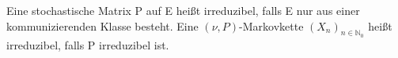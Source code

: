 Eine stochastische Matrix P auf E heißt irreduzibel, falls E nur aus einer kommunizierenden Klasse besteht. Eine $(\nu,P)$-Markovkette $(X_{n})_{n \in \mathbb{N}_{0}}$ heißt irreduzibel, falls P irreduzibel ist.